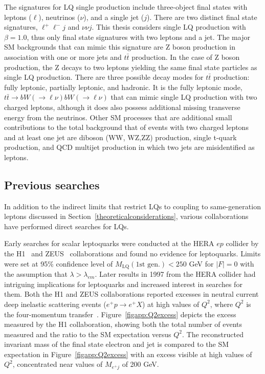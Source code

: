 The signatures for LQ single production include three-object final states with leptons ($\ell$), neutrinos ($\nu$), and a single jet ($j$).  There are two distinct final state signatures, $\ell^{+} \ell^{-} j$ and $\nu \nu j$.  This thesis considers single LQ production with $\beta=1.0$, thus only final state signatures with two leptons and a jet.  The major SM backgrounds that can mimic this signature are Z boson production in association with one or more jets and $t\bar{t}$ production.  In the case of Z boson production, the Z decays to two leptons yielding the same final state particles as single LQ production.  There are three possible decay modes for $t\bar{t}$ production: fully leptonic, partially leptonic, and hadronic.  It is the fully leptonic mode, $t\bar{t} \rightarrow bW(\rightarrow\ell\nu)bW(\rightarrow\ell\nu)$ that can mimic single LQ production with two charged leptons, although it does also possess additional missing transverse energy from the neutrinos.  Other SM processes that are additional small contributions to the total background that of events with two charged leptons and at least one jet are diboson (WW, WZ,ZZ) production, single t-quark production, and QCD multijet production in which two jets are misidentified as leptons.  



\subsection{Previous searches}

In addition to the indirect limits that restrict LQs to coupling to same-generation leptons discussed in Section~\ref{theoreticalconsiderations}, various collaborations have performed direct searches for LQs.  

Early searches for scalar leptoquarks were conducted at the HERA $ep$ collider by the H1~\cite{Aid:1995wd,Abt:1993nr,Collaboration:2011qaa} and ZEUS~\cite{Derrick:1993by} collaborations and found no evidence for leptoquarks.  Limits were set at 95\% confidence level of $M_{\text{LQ}}(\text{1st gen.}) < 250$ GeV for $|F|=0$ with the assumption that $\lambda > \lambda_{em}$.  Later results in 1997 from the HERA collider had intriguing implications for leptoquarks and increased interest in searches for them.  Both the H1 and ZEUS collaborations reported excesses in neutral current deep inelastic scattering events ($e^+ p \rightarrow e^+ X$) at high values of $Q^2$, where $Q^2$ is the four-momentum transfer~\cite{H1excess,ZEUSexcess}.  Figure~\ref{figapp:Q2excess} depicts the excess measured by the H1 collaboration, showing both the total number of events measured and the ratio to the SM expectation versus $Q^2$.  The reconstructed invariant mass of the final state electron and jet is compared to the SM expectation in Figure~\ref{figapp:Q2excess} with an excess visible at high values of $Q^2$, concentrated near values of $M_{e^+ j}$ of 200 GeV.  

